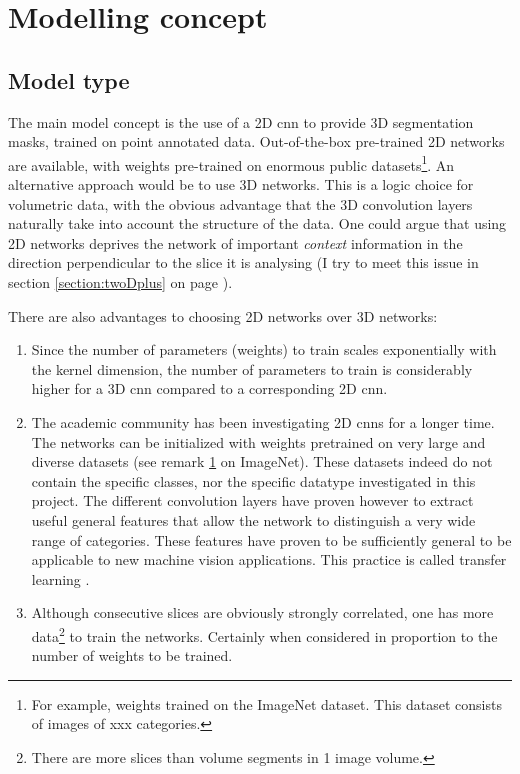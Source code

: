 \section{Modelling concept}

\subsection{Model type}

The main model concept is the use of a 2D \acrfull{cnn} to provide 3D segmentation masks, trained on point annotated data.
Out-of-the-box pre-trained 2D networks are available, with weights pre-trained on enormous public datasets\footnote{\label{footnote:Imagenet}For example, weights trained on the ImageNet dataset. 
This dataset consists of  images of xxx categories.}.
An alternative approach would be to use 3D networks. This is a logic choice for volumetric data, with the obvious advantage that the 3D convolution layers naturally take into account the structure of the data.
One could argue that using 2D networks deprives the network of important \textit{context} information in the direction perpendicular to the slice it is analysing (I try to meet this issue in section \ref{section:twoDplus} on page \pageref{section:twoDplus}). 

There are also advantages to choosing 2D networks over 3D networks:
\begin{enumerate}
    \item Since the number of parameters (weights) to train scales exponentially with the kernel dimension, the number of parameters to train is considerably higher for a 3D \acrshort{cnn} compared to a corresponding 2D \acrshort{cnn}.
    \item The academic community has been investigating 2D \acrlong{cnn}s for a longer time. The networks can be initialized with weights pretrained on very large and diverse datasets (see remark \ref{footnote:Imagenet} on ImageNet). 
    These datasets indeed do not contain the specific classes, nor the specific datatype investigated in this project. 
    The different convolution layers have proven however to extract useful general features that allow the network to distinguish a very wide range of categories. 
    These features have proven to be sufficiently general to be applicable to new machine vision applications. This practice is called transfer learning .
    \item Although consecutive slices are obviously strongly correlated, one has more data\footnote{There are more slices than volume segments in 1 image volume.} to train the networks. Certainly when considered in proportion to the number of weights to be trained.
\end{enumerate}

